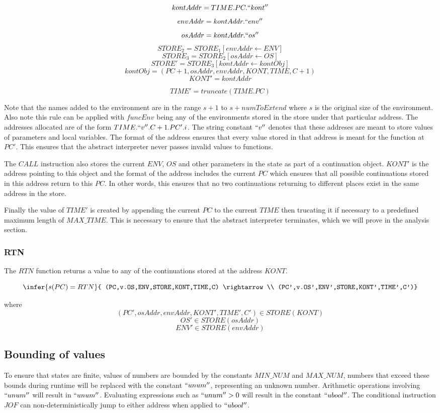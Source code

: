 \documentclass[12pt]{article}
\begin{document}
$$kontAddr = TIME.PC.``kont''$$
$$envAddr = kontAddr.``env''$$
$$osAddr = kontAddr.``os''$$
$$STORE_2=STORE_1[envAddr \leftarrow ENV]$$
$$STORE_3=STORE_2[osAddr \leftarrow OS]$$
$$STORE'=STORE_3[kontAddr \leftarrow kontObj]$$
$$kontObj = (PC+1,osAddr,envAddr,KONT,TIME,C+1)$$
$$KONT' = kontAddr$$

$$TIME' = truncate(TIME.PC)$$

Note that the names added to the environment are in the range $s+1$ to $s+numToExtend$ where $s$ is the original size of the environment. Also note this rule can be applied with $funcEnv$ being any of the environments stored in the store under that particular address. The addresses allocated are of the form $TIME.``v''.C+1.PC'.i$. The string constant $``v''$ denotes that these addreses are meant to store values of parameters and local variables. The format of the address ensures that every value stored in that address is meant for the function at $PC'$. This ensures that the abstract interpreter never passes invalid values to functions.

The $CALL$ instruction also stores the current $ENV$, $OS$ and other parameters in the state as part of a continuation object. $KONT'$ is the address pointing to this object and the format of the address includes the current $PC$ which ensures that all possible continuations stored in this address return to this $PC$. In other words, this ensures that no two continuations returning to different places exist in the same address in the store.

Finally the value of $TIME'$ is created by appending the current $PC$ to the current $TIME$ then trucating it if necessary to a predefined maximum length of $MAX\_TIME$. This is necessary to ensure that the abstract interpreter terminates, which we will prove in the analysis section.

\subsubsection{RTN}
The $RTN$ function returns a value to any of the continuations stored at the address $KONT$.

$$\infer{s(PC) = RTN}{
    (PC,v.OS,ENV,STORE,KONT,TIME,C) \rightarrow \\
    (PC',v.OS',ENV',STORE,KONT',TIME',C')}$$

where
$$(PC',osAddr,envAddr,KONT',TIME',C') \in STORE(KONT)$$
$$OS' \in STORE(osAddr)$$
$$ENV' \in STORE(envAddr)$$

\subsection{Bounding of values}
To ensure that states are finite, values of numbers are bounded by the constants $MIN\_NUM$ and $MAX\_NUM$, numbers that exceed these bounds during runtime will be replaced with the constant $``unum''$, representing an unknown number. Arithmetic operations involving $``unum''$ will result in $``unum''$. Evaluating expressions such as $``unum'' > 0$ will result in the constant $``ubool''$. The conditional instruction $JOF$ can non-deterministically jump to either address when applied to $``ubool''$.
\end{document}
